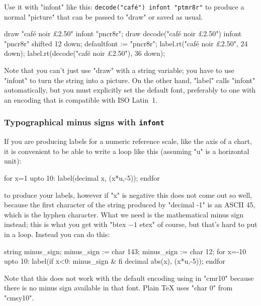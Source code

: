 \documentclass[a4paper,landscape]{article}
\begin{document}
Use it with "infont" like this: \verb|decode("café") infont "ptmr8r"| to produce a
normal "picture" that can be passed to "draw" or saved as
usual. 
\begin{code}
  draw "café noir £2.50" infont "pncr8r";
  draw decode("café noir £2.50") infont "pncr8r" shifted 12 down;
  defaultfont := "pncr8r";
  label.rt("café noir £2.50", 24 down);
  label.rt(decode("café noir £2.50"), 36 down);
\end{code}
Note that you can't just use "draw" with a string variable; you have to use
"infont" to turn the string into a picture.
On the other hand, "label" calls "infont" automatically, but you must explicitly set
the default font, preferably to one with an encoding that 
is compatible with ISO Latin~1.


\newpage
\subsubsection{Typographical minus signs with \texttt{infont}}

If you are producing labels for a numeric reference scale, like the axis of a chart,
it is convenient to be able to write a loop like this (assuming "u" is a horizontal
unit):
\begin{code}
    for x=1 upto 10: label(decimal x, (x*u,-5)); endfor
\end{code}
to produce your labels, however if "x" is negative this does not come out so well,
because the first character of the string produced by "decimal -1" is an ASCII 45,
which is the hyphen character.  What we need is the mathematical minus sign instead;
this is what you get with "btex $-1$ etex" of course, but that's hard to put in a
loop.  Instead you can do this: 
\begin{code}
    string minus_sign;
    minus_sign := char 143; %
    minus_sign := char 12;  %
    for x=-10 upto 10: 
        label(if x<0: minus_sign & fi decimal abs(x), (x*u,-5)); 
    endfor
\end{code}
Note that this does not work with the default encoding using in "cmr10" because
there is no minus sign available in that font.  Plain TeX uses "char 0" from
"cmsy10".
\end{document}

